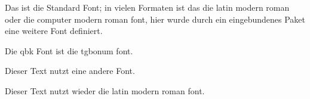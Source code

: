 \documentclass[a5paper]{article}
\begin{document}
Das ist die Standard Font; in vielen Formaten ist das die
latin modern roman oder die computer modern roman font,
hier wurde durch ein eingebundenes Paket eine weitere Font
definiert.

{\selectfont Die qbk Font ist die tgbonum font.}

{\selectfont Dieser Text nutzt eine andere Font.}

{\selectfont Dieser Text nutzt wieder die latin modern roman font.}
\end{document}
